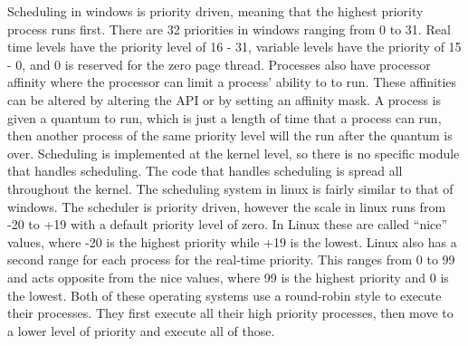 \documentclass[onecolumn, draftclsnofoot, 10pt, titlepage, compsoc]{IEEEtran}
\begin{document}
Scheduling in windows is priority driven, meaning that the highest priority process runs first. There are 32 priorities in windows ranging from 0 to 31. Real time levels have the priority level of 16 - 31, variable levels have the priority of 15 - 0, and 0 is reserved for the zero page thread. Processes also have processor affinity where the processor can limit a process’ ability to to run. These affinities can be altered by altering the API or by setting an affinity mask. A process is given a quantum to run, which is just a length of time that a process can run, then another process of the same priority level will the run after the quantum is over. Scheduling is implemented at the kernel level, so there is no specific module that handles scheduling. The code that handles scheduling is spread all throughout the kernel. The scheduling system in linux is fairly similar to that of windows. The scheduler is priority driven, however the scale in linux runs from -20 to +19 with a default priority level of zero. In Linux these are called “nice” values, where -20 is the highest priority while +19 is the lowest. Linux also has a second range for each process for the real-time priority. This ranges from 0 to 99 and acts opposite from the nice values, where 99 is the highest priority and 0 is the lowest. Both of these operating systems use a round-robin style to execute their processes. They first execute all their high priority processes, then move to a lower level of priority and execute all of those.\\
\end{document}
